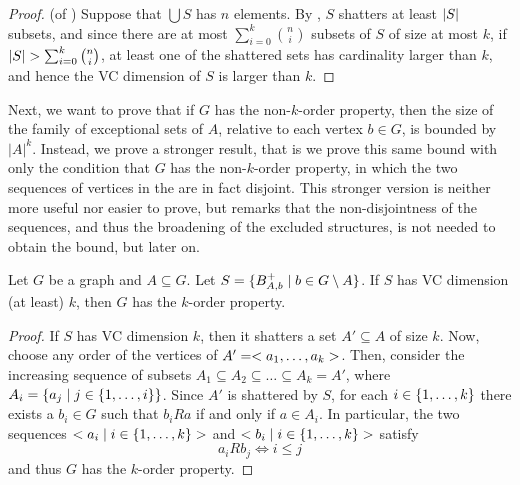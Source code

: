     \begin{proof} (of )
        Suppose that $\bigcup S$ has $n$ elements.
        By , $S$ shatters at least $| S |$ subsets, and since there are at most
        $\sum_{i=0}^k \binom{n}{i}$ subsets of $S$ of size at most $k$, if
        $| S | > \sum_{i=0}^k \binom{n}{i}$, at least one of the shattered sets has cardinality larger than $k$,
        and hence the VC dimension of $S$ is larger than $k$.
    \end{proof}

    Next, we want to prove that if $G$ has the non-$k$-order property, then the size of the family of exceptional
    sets of $A$, relative to each vertex $b \in G$, is bounded by $|A|^k$.
    Instead, we prove a stronger result, that is we prove this same bound with only the condition that $G$
    has the  non-$k$-order property, in which the two sequences of vertices in the 
    are in fact disjoint.
    This stronger version is neither more useful nor easier to prove, but remarks that the non-disjointness of the sequences,
    and thus the broadening of the excluded structures, is not needed to obtain the bound, but later on.

    \begin{lemma} \label{lem:vc_dimension_implies_k_order_property}
        Let $G$ be a graph and $A \subseteq G$.
        Let $S = \{ B^+_{A,b} \mid b \in G \setminus A \}$.
        If $S$ has VC dimension (at least) $k$, then $G$ has the $k$-order property.
        \begin{proof}
            If $S$ has VC dimension $k$, then it shatters a set $A' \subseteq A$ of size $k$.
            Now, choose any order of the vertices of $A' = < a_1, \dots, a_k >$.
            Then, consider the increasing sequence of subsets $A_1 \subseteq A_2 \subseteq \dots \subseteq A_k = A'$,
            where $A_i = \{ a_j \mid j \in \{ 1, \dots, i \} \}$.
            Since $A'$ is shattered by $S$, for each $i \in \{ 1, \dots, k \}$ there exists a $b_i \in G$ such that
            $b_i R a$ if and only if $a \in A_i$.
            In particular, the two sequences $< a_i \mid i \in \{ 1, \dots, k \} >$ and
            $< b_i \mid i \in \{ 1, \dots, k \} >$ satisfy
            \[
                a_i R b_j \Leftrightarrow i \leq j
            \]
            and thus $G$ has the $k$-order property.
        \end{proof}
    \end{lemma}

